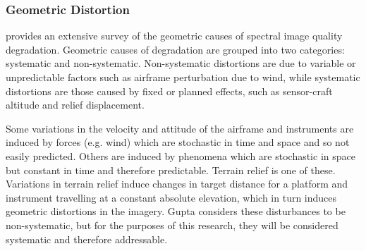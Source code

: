 




\subsubsection{Geometric Distortion}




\cite{Gupta2018} provides an extensive survey of the geometric causes of spectral image quality degradation. Geometric causes of degradation are grouped into two categories: systematic and non-systematic. Non-systematic distortions are due to variable or unpredictable factors such as airframe perturbation due to wind, while systematic distortions are those caused by fixed or planned effects, such as sensor-craft altitude and relief displacement.

Some variations in the velocity and attitude of the airframe and instruments are induced by forces (e.g. wind) which are stochastic in time and space and so not easily predicted. Others are induced by phenomena which are stochastic in space but constant in time and therefore predictable. Terrain relief is one of these. Variations in terrain relief induce changes in target distance for a platform and instrument travelling at a constant absolute elevation, which in turn induces geometric distortions in the imagery. Gupta \cite{Gupta2018} considers these disturbances to be non-systematic, but for the purposes of this research, they will be considered systematic and therefore addressable.

